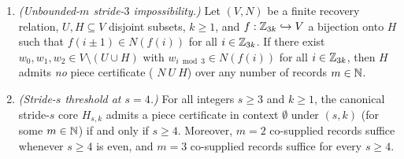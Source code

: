 \begin{proposition}\label{prop:CS}
\begin{enumerate}
\item \emph{(Unbounded-$m$ stride-$3$ impossibility.)} Let $(V, N)$ be a finite recovery relation, $U, H \subseteq V$
  disjoint subsets, $k \ge 1$, and $f : \mathbb{Z}_{3k} \hookrightarrow V$ a bijection onto $H$ such that $f(i \pm 1) \in N(f(i))$
  for all $i \in \mathbb{Z}_{3k}$. If there exist $w_0, w_1, w_2 \in V \setminus (U \cup H)$ with $w_{i \bmod 3} \in N(f(i))$ for
  all $i \in \mathbb{Z}_{3k}$, then $H$ admits \emph{no} piece certificate ( $N\ U\ H$) over any number of
  records $m \in \mathbb{N}$.
\item \emph{(Stride-$s$ threshold at $s = 4$.)} For all integers $s \ge 3$ and $k \ge 1$, the canonical stride-$s$ core
  $H_{s,k}$ admits a piece certificate in context $\emptyset$ under $(s, k)$ (for some $m \in \mathbb{N}$) if and
  only if $s \ge 4$. Moreover, $m = 2$ co-supplied records suffice whenever $s \ge 4$ is even, and $m = 3$ co-supplied
  records suffice for every $s \ge 4$.
\end{enumerate}
\end{proposition}

